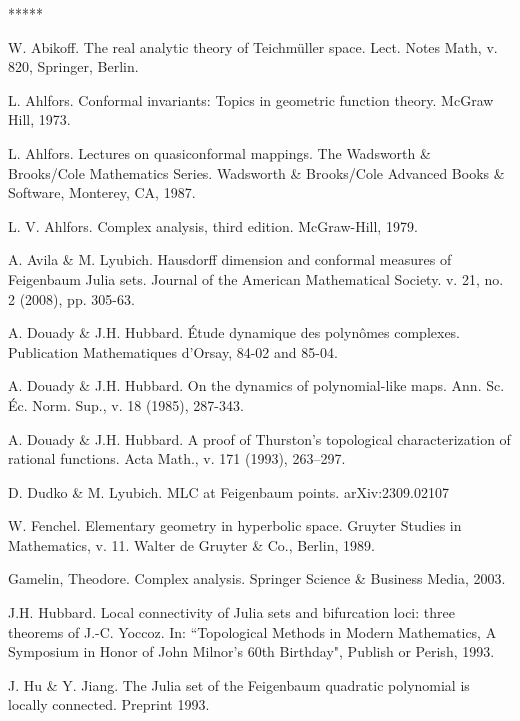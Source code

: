 
\begin{thebibliography}{*****}

 W. Abikoff. The real analytic theory of Teichm\"uller space. 
      Lect. Notes Math, v. 820, Springer, Berlin. 

 L. Ahlfors. Conformal invariants: Topics in geometric function theory. McGraw Hill, 1973.

L. Ahlfors.  Lectures on quasiconformal mappings.
 The Wadsworth \& Brooks/Cole Mathematics Series. Wadsworth \&
  Brooks/Cole Advanced Books \& Software, Monterey, CA, 1987.
  
L. V. Ahlfors. Complex analysis, third edition. McGraw-Hill, 1979.

 A. Avila \& M. Lyubich.
Hausdorff dimension and conformal measures of Feigenbaum Julia sets. Journal of the American Mathematical Society. v. 21, no. 2 (2008), pp. 305-63.



 A. Douady \& J.H. Hubbard.
  \'{E}tude dynamique des polyn\^{o}mes complexes.
 Publication Mathematiques d'Orsay,
84-02 and 85-04.


 A. Douady \& J.H. Hubbard. On the dynamics of polynomial-like maps.
    Ann. Sc. \'{E}c. Norm. Sup., v. 18 (1985), 287-343.

  A. Douady \& J.H. Hubbard.
  A proof of Thurston's topological characterization of rational functions.
  Acta Math., v. 171 (1993), 263--297. 
  
 D. Dudko \& M. Lyubich.
MLC at Feigenbaum points. arXiv:2309.02107


W. Fenchel.
 Elementary geometry in hyperbolic space.
  Gruyter Studies in Mathematics, v. 11.
   Walter de Gruyter \& Co., Berlin, 1989.

Gamelin, Theodore. Complex analysis. Springer Science \& Business Media, 2003.

 J.H. Hubbard.  Local connectivity of Julia sets and bifurcation loci:
      three theorems of J.-C. Yoccoz. 
     In: ``Topological Methods in Modern Mathematics, A Symposium in
     Honor of John Milnor's 60th Birthday", Publish or Perish, 1993.

 J. Hu \& Y. Jiang. The Julia set of the Feigenbaum quadratic polynomial is
  locally connected. Preprint 1993. 


\end{thebibliography}
